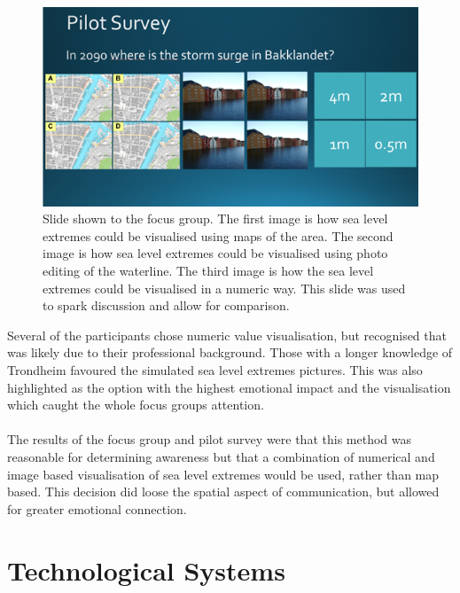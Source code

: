 \begin{figure}[h!]
    \centering
    \includegraphics[width=1\textwidth]{fig_results/slide-pilot-survey.png}
    \caption{Slide shown to the focus group. The first image is how sea level extremes could be visualised using maps of the area. The second image is how sea level extremes could be visualised using photo editing of the waterline. The third image is how the sea level extremes could be visualised in a numeric way. This slide was used to spark discussion and allow for comparison.}
    \label{fig:slide}
\end{figure}

Several of the participants chose numeric value visualisation, but recognised that was likely due to their professional background. Those with a longer knowledge of Trondheim favoured the simulated sea level extremes pictures. This was also highlighted as the option with the highest emotional impact and the visualisation which caught the whole focus groups attention.

\paragraph{}

The results of the focus group and pilot survey were that this method was reasonable for determining awareness but that a combination of numerical and image based visualisation of sea level extremes would be used, rather than map based. This decision did loose the spatial aspect of communication, but allowed for greater emotional connection.

\section{Technological Systems}


